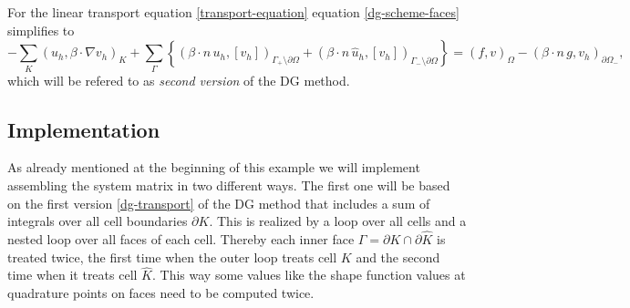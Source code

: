 \documentclass[11pt]{article}
\begin{document}
For the linear transport equation \eqref{transport-equation}
equation \eqref{dg-scheme-faces} simplifies to
\begin{equation}\label{dg-transport-gamma}
  -\sum_K(u_h,\beta\cdot\nabla v_h)_K+\sum_\Gamma\left\{(\beta\cdot n\, u_h, [v_h])_{\Gamma_+\setminus\partial\Omega}+(\beta\cdot n\, \hat u_h, [v_h])_{\Gamma_-\setminus\partial\Omega}\right\}=(f,v)_\Omega-(\beta\cdot n\, g, v_h)_{\partial\Omega_-},
\end{equation}
which will be refered to as \emph{second version} of the DG method.
\subsection{Implementation}
As already mentioned at the beginning of this example we will
implement assembling the system matrix in two different ways.
The first one will be based on the first version \eqref{dg-transport}
of the DG method that includes a sum of integrals over all cell
boundaries $\partial K$. This is realized by a loop over all cells and
a nested loop over all faces of each cell.  Thereby each inner face
$\Gamma=\partial K\cap\partial \hat K$ is treated twice, the first
time when the outer loop treats cell $K$ and the second time when it
treats cell $\hat K$. This way some values like the shape function
values at quadrature points on faces need to be computed twice.
\end{document}
